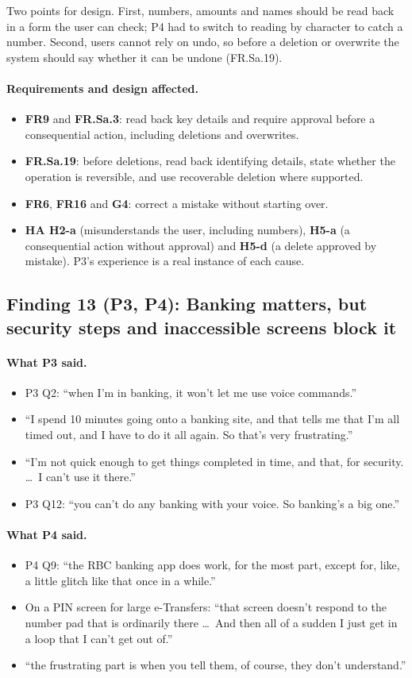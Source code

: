 \documentclass[12pt, titlepage]{article}
\newcommand{\saidthree}{\paragraph{What P3 said.}}
\newcommand{\saidfour}{\paragraph{What P4 said.}}
\newcommand{\affects}{\paragraph{Requirements and design affected.}}
\begin{document}
Two points for design. First, numbers, amounts and names should be read back in a form the user can check; P4 had to switch to reading by character to catch a number. Second, users cannot rely on undo, so before a deletion or overwrite the system should say whether it can be undone (FR.Sa.19).

\affects
\begin{itemize}
    \item \textbf{FR9} and \textbf{FR.Sa.3}: read back key details and require approval before a consequential action, including deletions and overwrites.
    \item \textbf{FR.Sa.19}: before deletions, read back identifying details, state whether the operation is reversible, and use recoverable deletion where supported.
    \item \textbf{FR6}, \textbf{FR16} and \textbf{G4}: correct a mistake without starting over.
    \item \textbf{HA H2-a} (misunderstands the user, including numbers), \textbf{H5-a} (a consequential action without approval) and \textbf{H5-d} (a delete approved by mistake). P3's experience is a real instance of each cause.
\end{itemize}

\subsection{Finding 13 (P3, P4): Banking matters, but security steps and inaccessible screens block it}

\saidthree
\begin{itemize}
    \item P3 Q2: ``when I'm in banking, it won't let me use voice commands.''
    \item ``I spend 10 minutes going onto a banking site, and that tells me that I'm all timed out, and I have to do it all again. So that's very frustrating.''
    \item ``I'm not quick enough to get things completed in time, and that, for security. \ldots\ I can't use it there.''
    \item P3 Q12: ``you can't do any banking with your voice. So banking's a big one.''
\end{itemize}

\saidfour
\begin{itemize}
    \item P4 Q9: ``the RBC banking app does work, for the most part, except for, like, a little glitch like that once in a while.''
    \item On a PIN screen for large e-Transfers: ``that screen doesn't respond to the number pad that is ordinarily there \ldots\ And then all of a sudden I just get in a loop that I can't get out of.''
    \item ``the frustrating part is when you tell them, of course, they don't understand.''
\end{itemize}
\end{document}
